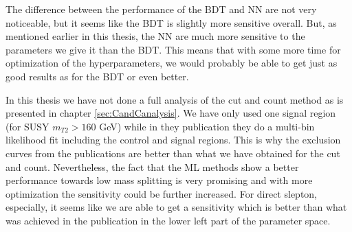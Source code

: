The difference between the performance of the BDT and NN are not very noticeable, but it seems like the BDT is slightly more sensitive overall. But, as mentioned earlier in this thesis, the NN are much more sensitive to the parameters we give it than the BDT. This means that with some more time for optimization of the hyperparameters, we would probably be able to get just as good results as for the BDT or even better. 

In this thesis we have not done a full analysis of the cut and count method as is presented in chapter \ref{sec:CandCanalysis}. We have only used one signal region (for SUSY $m_{T2} > 160$ GeV) while in they publication they do a multi-bin likelihood fit including the control and signal regions. This is why the exclusion curves from the publications are better than what we have obtained for the cut and count. Nevertheless, the fact that the ML methods show a better performance towards low mass splitting is very promising and with more optimization the sensitivity could be further increased. For direct slepton, especially, it seems like we are able to get a sensitivity which is better than what was achieved in the publication in the lower left part of the parameter space.

